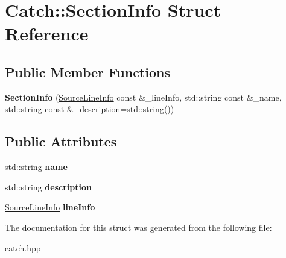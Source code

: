 \hypertarget{structCatch_1_1SectionInfo}{
\section{Catch::SectionInfo Struct Reference}
\label{structCatch_1_1SectionInfo}
}
\subsection*{Public Member Functions}
\begin{DoxyCompactItemize}
\item 
\hypertarget{structCatch_1_1SectionInfo_a27aff3aaf8b6611f3651b17111a272c6}{
{\bfseries SectionInfo} (\hyperlink{structCatch_1_1SourceLineInfo}{SourceLineInfo} const \&\_\-lineInfo, std::string const \&\_\-name, std::string const \&\_\-description=std::string())}
\label{structCatch_1_1SectionInfo_a27aff3aaf8b6611f3651b17111a272c6}

\end{DoxyCompactItemize}
\subsection*{Public Attributes}
\begin{DoxyCompactItemize}
\item 
\hypertarget{structCatch_1_1SectionInfo_a704c8fc662d309137e0d4f199cb7df58}{
std::string {\bfseries name}}
\label{structCatch_1_1SectionInfo_a704c8fc662d309137e0d4f199cb7df58}

\item 
\hypertarget{structCatch_1_1SectionInfo_a0052060219a6de74bb7ade34d4163a4e}{
std::string {\bfseries description}}
\label{structCatch_1_1SectionInfo_a0052060219a6de74bb7ade34d4163a4e}

\item 
\hypertarget{structCatch_1_1SectionInfo_adbc83b8a3507c4acc8ee249e93465711}{
\hyperlink{structCatch_1_1SourceLineInfo}{SourceLineInfo} {\bfseries lineInfo}}
\label{structCatch_1_1SectionInfo_adbc83b8a3507c4acc8ee249e93465711}

\end{DoxyCompactItemize}


The documentation for this struct was generated from the following file:\begin{DoxyCompactItemize}
\item 
catch.hpp\end{DoxyCompactItemize}
